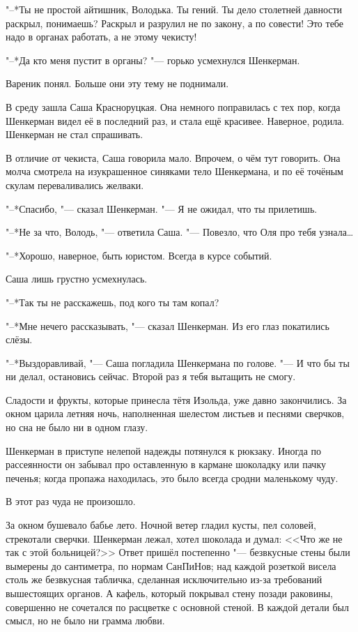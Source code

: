 "--*Ты не простой айтишник, Володька.
Ты гений.
Ты дело столетней давности раскрыл, понимаешь?
Раскрыл и разрулил не по закону, а по совести!
Это тебе надо в органах работать, а не этому чекисту!

"--*Да кто меня пустит в органы? "--- горько усмехнулся Шенкерман.

Вареник понял.
Больше они эту тему не поднимали.

\label{Wed_2012_09_05}

В среду зашла Саша Красноруцкая.
Она немного поправилась с тех пор, когда Шенкерман видел её в последний раз, и стала ещё красивее.
Наверное, родила.
Шенкерман не стал спрашивать.

В отличие от чекиста, Саша говорила мало.
Впрочем, о чём тут говорить.
Она молча смотрела на изукрашенное синяками тело Шенкермана, и по её точёным скулам переваливались желваки.

"--*Спасибо, "--- сказал Шенкерман.
"--- Я не ожидал, что ты прилетишь.

"--*Не за что, Володь, "--- ответила Саша.
"--- Повезло, что Оля про тебя узнала\dots{}

"--*Хорошо, наверное, быть юристом.
Всегда в курсе событий.

Саша лишь грустно усмехнулась.

"--*Так ты не расскажешь, под кого ты там копал?

"--*Мне нечего рассказывать, "--- сказал Шенкерман.
Из его глаз покатились слёзы.

"--*Выздоравливай, "--- Саша погладила Шенкермана по голове.
"--- И что бы ты ни делал, остановись сейчас.
Второй раз я тебя вытащить не смогу.

Сладости и фрукты, которые принесла тётя Изольда, уже давно закончились.
За окном царила летняя ночь, наполненная шелестом листьев и песнями сверчков, но сна не было ни в одном глазу.

Шенкерман в приступе нелепой надежды потянулся к рюкзаку.
Иногда по рассеянности он забывал про оставленную в кармане шоколадку или пачку печенья;
когда пропажа находилась, это было всегда сродни маленькому чуду.

В этот раз чуда не произошло.

За окном бушевало бабье лето.
Ночной ветер гладил кусты, пел соловей, стрекотали сверчки.
Шенкерман лежал, хотел шоколада и думал: <<Что же не так с этой больницей?>>
Ответ пришёл постепенно "--- безвкусные стены были вымерены до сантиметра, по нормам СанПиНов;
над каждой розеткой висела столь же безвкусная табличка, сделанная исключительно из-за требований вышестоящих органов.
А кафель, который покрывал стену позади раковины, совершенно не сочетался по расцветке с основной стеной.
В каждой детали был смысл, но не было ни грамма любви.

